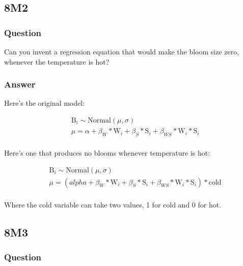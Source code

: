 \documentclass[
]{book}
\begin{document}
\hypertarget{m2-5}{%
\subsection*{8M2}\label{m2-5}}

\hypertarget{question-79}{%
\subsubsection*{Question}\label{question-79}}

Can you invent a regression equation that would make the bloom size zero, whenever the temperature is hot?

\hypertarget{answer-79}{%
\subsubsection*{Answer}\label{answer-79}}

Here's the original model:

\[
\begin{aligned}
&\text{B}_i \sim \text{Normal}(\mu,\sigma) \\
&\mu = \alpha + \beta_{W} * \text{W}_i + \beta_S * \text{S}_i + \beta_{WS} * \text{W}_i* \text{S}_i  \\
\end{aligned}
\]

Here's one that produces no blooms whenever temperature is hot:

\[
\begin{aligned}
&\text{B}_i \sim \text{Normal}(\mu,\sigma) \\
&\mu = \left( alpha + \beta_{W} * \text{W}_i + \beta_S * \text{S}_i + \beta_{WS} * \text{W}_i* \text{S}_i \right) * \text{cold}  \\
\end{aligned}
\]

Where the cold variable can take two values, 1 for cold and 0 for hot.

\hypertarget{m3-5}{%
\subsection*{8M3}\label{m3-5}}

\hypertarget{question-80}{%
\subsubsection*{Question}\label{question-80}}
\end{document}
